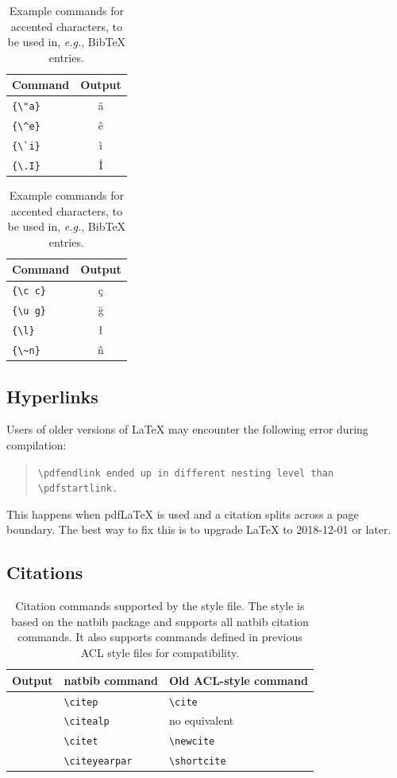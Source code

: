 \documentclass[11pt]{article}
\begin{document}
\begin{table}
\centering
\begin{tabular}{lc}
\toprule
\textbf{Command} & \textbf{Output}\\
\midrule
\verb|{\"a}| & {\"a} \\
\verb|{\^e}| & {\^e} \\
\verb|{\`i}| & {\`i} \\ 
\verb|{\.I}| & {\.I} \\ 
\bottomrule
\end{tabular}
\begin{tabular}{lc}
\toprule
\textbf{Command} & \textbf{Output}\\
\midrule
\verb|{\c c}| & {\c c} \\ 
\verb|{\u g}| & {\u g} \\ 
\verb|{\l}| & {\l} \\ 
\verb|{\~n}| & {\~n} \\ 
\bottomrule
\end{tabular}
\caption{Example commands for accented characters, to be used in, \emph{e.g.}, Bib\TeX{} entries.}
\label{tab:accents}
\end{table}

\subsection{Hyperlinks}

Users of older versions of \LaTeX{} may encounter the following error during compilation: 
\begin{quote}
\tt\verb|\pdfendlink| ended up in different nesting level than \verb|\pdfstartlink|.
\end{quote}
This happens when pdf\LaTeX{} is used and a citation splits across a page boundary. The best way to fix this is to upgrade \LaTeX{} to 2018-12-01 or later.

\subsection{Citations}

\begin{table}
\centering
\begin{tabular}{lll}
\hline
\textbf{Output} & \textbf{natbib command} & \textbf{Old ACL-style command}\\
\hline
\citep{Gusfield:97} & \verb|\citep| & \verb|\cite| \\
\citealp{Gusfield:97} & \verb|\citealp| & no equivalent \\
\citet{Gusfield:97} & \verb|\citet| & \verb|\newcite| \\
\citeyearpar{Gusfield:97} & \verb|\citeyearpar| & \verb|\shortcite| \\
\hline
\end{tabular}
\caption{\label{citation-guide}
Citation commands supported by the style file.
The style is based on the natbib package and supports all natbib citation commands.
It also supports commands defined in previous ACL style files for compatibility.
}
\end{table}
\end{document}
